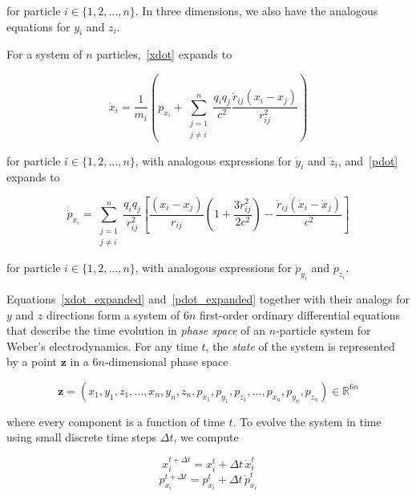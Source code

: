 \documentclass[12pt,a4paper]{article}
\theoremstyle{definition}
\theoremstyle{remark}
\begin{document}
for particle $i \in \{1, 2, \ldots, n\}$. In three dimensions, we also have the analogous equations for $y_i$ and $z_i$.

For a system of $n$ particles,~\eqref{xdot} expands to

\begin{equation}\label{xdot_expanded}
    \boxed{\dot{x}_i = \frac{1}{m_i} \left(p_{x_i} + \sum_{\substack{j=1 \\ j \neq i}}^{n} \frac{q_i q_j}{c^2} \frac{\dot{r}_{ij} (x_i - x_j)}{r_{ij}^2}\right)}
\end{equation}

for particle $i \in \{1, 2, \ldots, n\}$, with analogous expressions for $\dot{y}_i$ and $\dot{z}_i$, and~\eqref{pdot} expands to

\begin{equation}\label{pdot_expanded}
    \boxed{\dot{p}_{x_i} = \sum_{\substack{j=1 \\ j \neq i}}^{n} \frac{q_i q_j}{r_{ij}^2}\left[\frac{(x_i - x_j)}{r_{ij}}\left(1 + \frac{3\dot{r}_{ij}^2}{2 c^2}\right) - \frac{\dot{r}_{ij}(\dot{x}_i - \dot{x}_j)}{c^2}\right]}
\end{equation}

for particle $i \in \{1, 2, \ldots, n\}$, with analogous expressions for $\dot{p}_{y_i}$ and $\dot{p}_{z_i}$.

Equations~\eqref{xdot_expanded} and~\eqref{pdot_expanded} together with their analogs for $y$ and $z$ directions form a system of $6n$ first-order ordinary differential equations that describe the time evolution in \textit{phase space} of an $n$-particle system for Weber's electrodynamics. For any time $t$, the \textit{state} of the system is represented by a point $\mathbf{z}$ in a $6n$-dimensional phase space

\begin{equation}\label{z}
    \mathbf{z} = (x_1, y_1, z_1, \ldots, x_n, y_n, z_n, p_{x_1}, p_{y_1}, p_{z_1}, \ldots, p_{x_n}, p_{y_n}, p_{z_n}) \in \mathbb{R}^{6n}
\end{equation}

where every component is a function of time $t$. To evolve the system in time using small discrete time steps $\Delta t$, we compute

\begin{equation}\label{update_step_x}
    x_i^{t + \Delta t} = x_i^t + \Delta t \, \dot{x}_i^t
\end{equation}
\begin{equation}\label{update_step_p}
    p_{x_i}^{t + \Delta t} = p_{x_i}^t + \Delta t \, \dot{p}_{x_i}^t
\end{equation}
\end{document}
